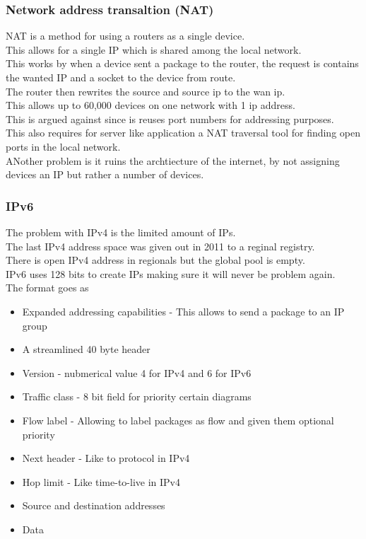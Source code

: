 \documentclass[12pt, a4paper]{article}
\begin{document}
			\subsubsection{Network address transaltion (NAT)}
				NAT is a method for using a routers as a single device.\\
				This allows for a single IP which is shared among the local network.\\
				This works by when a device sent a package to the router, the request is contains the wanted IP and a socket to the device from route.\\
				The router then rewrites the source and source ip to the wan ip.\\
				This allows up to 60,000 devices on one network with 1 ip address.\\
				This is argued against since is reuses port numbers for addressing purposes.\\
				This also requires for server like application a NAT traversal tool for finding open ports in the local network.\\
				ANother problem is it ruins the archtiecture of the internet, by not assigning devices an IP but rather a number of devices.\\
			\subsubsection{IPv6}
				The problem with IPv4 is the limited amount of IPs.\\
				The last IPv4 address space was given out in 2011 to a reginal registry.\\
				There is open IPv4 address in regionals but the global pool is empty.\\
				IPv6 uses 128 bits to create IPs making sure it will never be problem again.\\
				The format goes as
				\begin{itemize}
					\item Expanded addressing capabilities - This allows to send a package to an IP group 
					\item A streamlined 40 byte header 
					\item Version - nubmerical value 4 for IPv4 and 6 for IPv6
					\item Traffic class - 8 bit field for priority certain diagrams
					\item Flow label - Allowing to label packages as flow and given them optional priority
					\item Next header - Like to protocol in IPv4
					\item Hop limit - Like time-to-live in IPv4
					\item Source and destination addresses
					\item Data
				\end{itemize}
\end{document}
